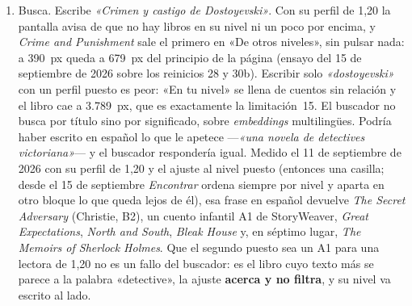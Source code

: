 \documentclass[11pt,a4paper]{article}
\begin{document}
\begin{enumerate}[leftmargin=*, itemsep=4pt]
  \item Busca. Escribe \emph{«Crimen y castigo de Dostoyevski»}. Con su perfil de 1,20
        la pantalla avisa de que no hay libros en su nivel ni un poco por encima, y
        \emph{Crime and Punishment} sale el primero en «De otros niveles», sin pulsar
        nada: a 390~px queda a 679~px del principio de la página (ensayo del 15 de
        septiembre de 2026 sobre los reinicios 28 y 30b). Escribir solo
        \emph{«dostoyevski»} con un perfil puesto es peor: «En tu nivel» se llena de
        cuentos sin relación y el libro cae a 3.789~px, que es exactamente la
        limitación~15. El buscador no busca por
        título sino por significado, sobre \emph{embeddings} multilingües. Podría haber
        escrito en español lo que le apetece —\emph{«una novela de detectives
        victoriana»}— y el buscador respondería igual. Medido el 11 de septiembre de
        2026 con su perfil de 1,20 y el ajuste al nivel puesto (entonces una casilla;
        desde el 15 de septiembre \emph{Encontrar} ordena siempre por nivel y aparta en
        otro bloque lo que queda lejos de él), esa frase en español devuelve \emph{The Secret Adversary} (Christie, B2), un cuento infantil
        A1 de StoryWeaver, \emph{Great Expectations}, \emph{North and South},
        \emph{Bleak House} y, en séptimo lugar, \emph{The Memoirs of Sherlock Holmes}.
        Que el segundo puesto sea un A1 para una lectora de 1,20 no es un fallo del
        buscador: es el libro cuyo texto más se parece a la palabra «detective», la
        ajuste \textbf{acerca y no filtra}, y su nivel va escrito al lado.


\end{enumerate}
\end{document}
